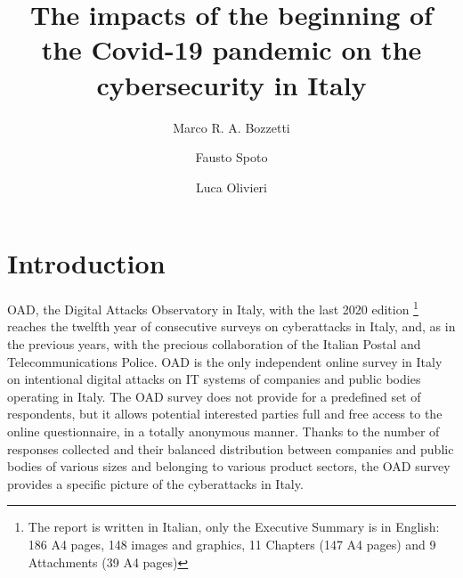 \documentclass{easychair}
\title{The impacts of the beginning of the Covid-19 pandemic on the cybersecurity in Italy}
\author{
Marco R. A. Bozzetti\inst{1}
\and
    Fausto Spoto\inst{2}
\and
   Luca Olivieri \inst{2}
}
\institute{
  President AIPSI\\
  Italian Chapter ISSA
\and
   University of Verona,
   Italy\\
   \email{\{fausto.spoto,luca.olivieri\}@univr.it}\\
 }
\begin{document}
\maketitle

\begin{abstract}
\end{abstract}


\section{Introduction}

OAD, the Digital Attacks Observatory in Italy, with the last 2020 edition \cite{OAD_report_2020} \footnote{The report is written in Italian, only 
the Executive Summary is in English: 186 A4 pages, 148 images and graphics, 11 Chapters (147 A4 pages) and 9 Attachments (39 A4 pages)} reaches the 
twelfth year of consecutive surveys on cyberattacks in Italy, and, as in the previous years, with the precious collaboration of the Italian Postal 
and Telecommunications Police. OAD is the only independent online survey in Italy on intentional digital attacks on IT systems of companies and public
bodies operating in Italy. The OAD survey does not provide for a predefined set of respondents, but it allows potential interested parties full and 
free access to the online questionnaire, in a totally anonymous manner. Thanks to the number of responses collected and their balanced distribution 
between companies and public bodies of various sizes and belonging to various product sectors, the OAD survey provides a specific picture of the cyberattacks in Italy.
\end{document}

